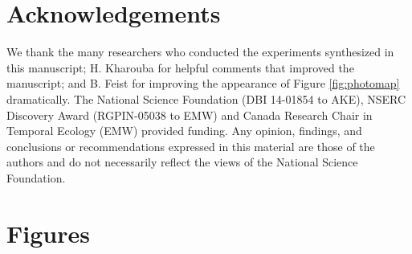 \documentclass{article}
\begin{document}
\section*{Acknowledgements}
We thank the many researchers who conducted the experiments synthesized in this manuscript; H. Kharouba for helpful comments that improved the manuscript; and B. Feist for improving the appearance of Figure \ref{fig:photomap} dramatically. The National Science Foundation (DBI 14-01854 to AKE), NSERC Discovery Award (RGPIN-05038 to EMW) and Canada Research Chair in Temporal Ecology (EMW) provided funding. Any opinion, findings, and conclusions or recommendations expressed in this material are those of the authors and do not necessarily reflect the views of the National Science Foundation.

\clearpage


\section* {Figures}
\end{document}
